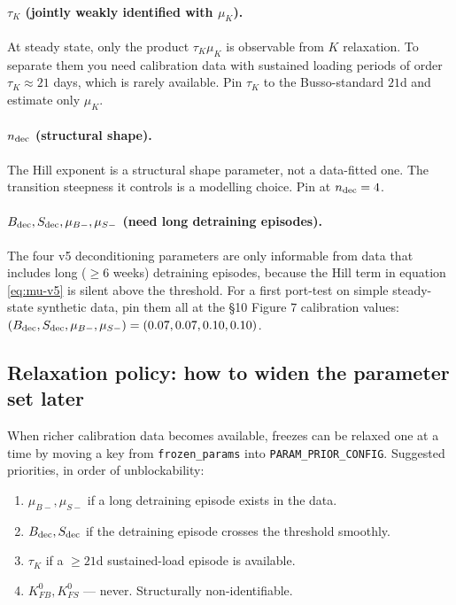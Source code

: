 \documentclass[11pt,a4paper]{article}
\theoremstyle{definition}
\begin{document}
\paragraph{$\tau_K$ (jointly weakly identified with $\mu_K$).}
At steady state, only the product $\tau_K \mu_K$ is observable from $K$
relaxation. To separate them you need calibration data with sustained
loading periods of order $\tau_K \approx 21$ days, which is rarely
available. Pin $\tau_K$ to the Busso-standard $21$d and estimate only
$\mu_K$.

\paragraph{$n_{\rm dec}$ (structural shape).}
The Hill exponent is a structural shape parameter, not a data-fitted
one. The transition steepness it controls is a modelling choice. Pin
at $n_{\rm dec} = 4$.

\paragraph{$B_{\rm dec}, S_{\rm dec}, \mu_{B-}, \mu_{S-}$ (need long detraining episodes).}
The four v5 deconditioning parameters are only informable from data
that includes long ($\ge 6$ weeks) detraining episodes, because the
Hill term in equation \eqref{eq:mu-v5} is silent above the threshold.
For a first port-test on simple steady-state synthetic data, pin them
all at the §10 Figure 7 calibration values:
$(B_{\rm dec}, S_{\rm dec}, \mu_{B-}, \mu_{S-}) = (0.07, 0.07, 0.10, 0.10)$.

\subsection{Relaxation policy: how to widen the parameter set later}

When richer calibration data becomes available, freezes can be relaxed
one at a time by moving a key from \texttt{frozen\_params} into
\texttt{PARAM\_PRIOR\_CONFIG}. Suggested priorities, in order of
unblockability:

\begin{enumerate}
  \item $\mu_{B-}, \mu_{S-}$ if a long detraining episode exists in the data.
  \item $B_{\rm dec}, S_{\rm dec}$ if the detraining episode crosses the threshold smoothly.
  \item $\tau_K$ if a $\ge 21$d sustained-load episode is available.
  \item $K_{FB}^0, K_{FS}^0$ --- never. Structurally non-identifiable.
\end{enumerate}
\end{document}
